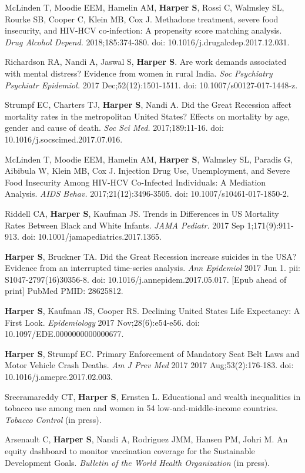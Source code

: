 \documentclass[
  letterpaper,
  DIV=11,
  numbers=noendperiod]{scrartcl}
\begin{document}
McLinden T, Moodie EEM, Hamelin AM, \textbf{Harper S}, Rossi C, Walmsley
SL, Rourke SB, Cooper C, Klein MB, Cox J. Methadone treatment, severe
food insecurity, and HIV-HCV co-infection: A propensity score matching
analysis. \emph{Drug Alcohol Depend.} 2018;185:374-380. doi:
10.1016/j.drugalcdep.2017.12.031.

Richardson RA, Nandi A, Jaswal S, \textbf{Harper S}. Are work demands
associated with mental distress? Evidence from women in rural India.
\emph{Soc Psychiatry Psychiatr Epidemiol.} 2017 Dec;52(12):1501-1511.
doi: 10.1007/s00127-017-1448-z.

Strumpf EC, Charters TJ, \textbf{Harper S}, Nandi A. Did the Great
Recession affect mortality rates in the metropolitan United States?
Effects on mortality by age, gender and cause of death. \emph{Soc Sci
Med.} 2017;189:11-16. doi: 10.1016/j.socscimed.2017.07.016.

McLinden T, Moodie EEM, Hamelin AM, \textbf{Harper S}, Walmsley SL,
Paradis G, Aibibula W, Klein MB, Cox J. Injection Drug Use,
Unemployment, and Severe Food Insecurity Among HIV-HCV Co-Infected
Individuals: A Mediation Analysis. \emph{AIDS Behav.}
2017;21(12):3496-3505. doi: 10.1007/s10461-017-1850-2.

Riddell CA, \textbf{Harper S}, Kaufman JS. Trends in Differences in US
Mortality Rates Between Black and White Infants. \emph{JAMA Pediatr.}
2017 Sep 1;171(9):911-913. doi: 10.1001/jamapediatrics.2017.1365.

\textbf{Harper S}, Bruckner TA. Did the Great Recession increase
suicides in the USA? Evidence from an interrupted time-series analysis.
\emph{Ann Epidemiol} 2017 Jun 1. pii: S1047-2797(16)30356-8. doi:
10.1016/j.annepidem.2017.05.017. {[}Epub ahead of print{]} PubMed PMID:
28625812.

\textbf{Harper S}, Kaufman JS, Cooper RS. Declining United States Life
Expectancy: A First Look. \emph{Epidemiology} 2017 Nov;28(6):e54-e56.
doi: 10.1097/EDE.0000000000000677.

\textbf{Harper S}, Strumpf EC. Primary Enforcement of Mandatory Seat
Belt Laws and Motor Vehicle Crash Deaths. \emph{Am J Prev Med} 2017 2017
Aug;53(2):176-183. doi: 10.1016/j.amepre.2017.02.003.

Sreeramareddy CT, \textbf{Harper S}, Ernsten L. Educational and wealth
inequalities in tobacco use among men and women in 54
low-and-middle-income countries. \emph{Tobacco Control} (in press).

Arsenault C, \textbf{Harper S}, Nandi A, Rodriguez JMM, Hansen PM, Johri
M. An equity dashboard to monitor vaccination coverage for the
Sustainable Development Goals. \emph{Bulletin of the World Health
Organization} (in press).
\end{document}
